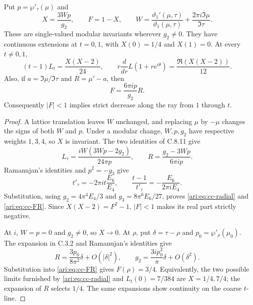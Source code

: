 \begin{proposition}\label{ari:C.8.12}
Put $p=\wp'_\tau(\mu)$ and
\[
 X=\frac{3Wp}{g_2},\qquad F=1-X,
 \qquad W=\frac{\vartheta_1'(\mu,\tau)}{\vartheta_1(\mu,\tau)}
              +\frac{2\pi i\Im\mu}{\Im\tau}.
\]
These are single-valued modular invariants wherever $g_2\ne0$.
They have continuous extensions at $t=0,1$, with
$X(0)=1/4$ and $X(1)=0$. At every $t\ne0,1$,
\begin{equation}\label{ari:eq:cc-radial}
 (t-1)L_t=\frac{X(X-2)}{24},\qquad
 r\frac{d}{dr}L(1+re^{i\theta})
       =\frac{\Re(X(X-2))}{12}.
\end{equation}
Also, if $a=\Im\mu/\Im\tau$ and $R=\mu'-a$, then
\begin{equation}\label{ari:eq:cc-FR}
 F=\frac{6\pi ip}{g_2}R.
\end{equation}
Consequently $|F|<1$ implies strict decrease along the ray
from $1$ through $t$.
\end{proposition}
\begin{proof}
A lattice translation leaves $W$ unchanged, and replacing $\mu$
by $-\mu$ changes the signs of both $W$ and $p$. Under a modular
change, $W,p,g_2$ have respective weights $1,3,4$, so $X$ is
invariant. The two identities of C.8.11 give
\[
 L_\tau=\frac{iW(3Wp-2g_2)}{24\pi p},\qquad
 R=\frac{g_2-3Wp}{6\pi ip}.
\]
Ramanujan's identities and $p^2=-g_3$ give
\[
 t'_\tau=-2\pi it\frac{E_6}{E_4},\qquad
 \frac{t-1}{t'_\tau}=-\frac{E_6}{2\pi iE_4}.
\]
Substitution, using $g_2=4\pi^4E_4/3$ and
$g_3=8\pi^6E_6/27$, proves \eqref{ari:eq:cc-radial} and
\eqref{ari:eq:cc-FR}. Since $X(X-2)=F^2-1$, $|F|<1$ makes
its real part strictly negative.

At $i$, $W=p=0$ and $g_2\ne0$, so $X\to0$. At $\rho$, put $\delta=\tau-\rho$ and $p_0=\wp'_\rho(\mu_0)$.
The expansion in C.3.2 and Ramanujan's identities give
\[
 R=\frac{3p_0}{8\pi^2}\delta+O(|\delta|^2),\qquad
 g_2=\frac{3ip_0^2}{\pi}\delta+O(\delta^2).
\]
Substitution into \eqref{ari:eq:cc-FR} gives $F(\rho)=3/4$.
Equivalently, the two possible limits furnished by
\eqref{ari:eq:cc-radial} and $L_t(0)=7/384$ are $X=1/4,7/4$;
the expansion of $R$ selects $1/4$. The same expansions show
continuity on the coarse $t$-line.
\end{proof}

